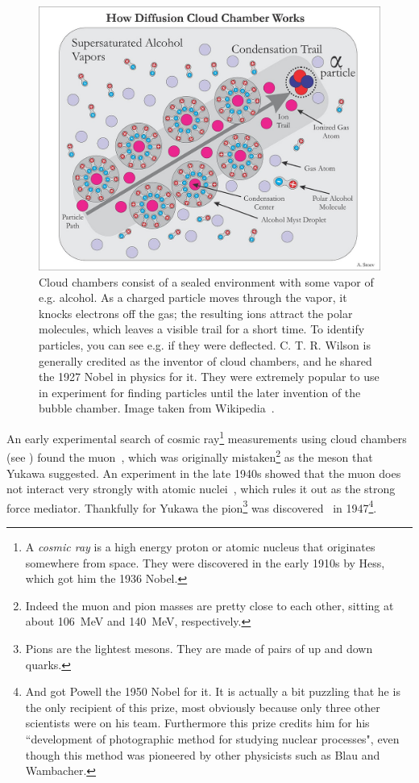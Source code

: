 \begin{figure}
  \centering
  \includegraphics[width=\linewidth]{figs/Diffusion_Cloud_chamber_explained.jpg}
  \caption{Cloud chambers consist of a sealed environment with some vapor
           of e.g. alcohol. As a charged particle moves through the vapor, it knocks
           electrons off the gas; the resulting ions attract the polar molecules,
           which leaves a visible trail for a short time. To identify particles,
           you can see e.g. if they were deflected. C. T. R. Wilson is generally 
           credited as the inventor of cloud chambers, and he shared the 1927 Nobel
           in physics for it. They were extremely popular to use in experiment
           for finding particles until the later invention of the bubble chamber.
           Image taken from Wikipedia~\cite{wiki_cloud}.}
  \label{fig:cloud}
\end{figure}

An early experimental search of cosmic ray\footnote{A {\it cosmic ray} is a high
energy proton or atomic nucleus that originates somewhere from space. They were
discovered in the early 1910s by Hess, which got him the 1936 Nobel.}
 measurements using
cloud chambers (see ) 
found the muon~\cite{neddermeyer_note_1937}, which was originally 
mistaken\footnote{Indeed the muon and pion masses are pretty close to each
other, sitting at about 106~MeV and 140~MeV, respectively.}
as the meson that Yukawa suggested. An experiment in the late 1940s showed that
the muon does not interact very strongly with atomic
nuclei~\cite{conversi_disintegration_1947}, which rules it out as the strong
force mediator. Thankfully for Yukawa the
pion\footnote{Pions are the lightest
mesons. They are made of pairs of up and down quarks.} was
discovered~\cite{lattes_processes_1947} in 1947\footnote{And got Powell
the 1950 Nobel for it. It is actually a bit puzzling that he is the only
recipient of this prize, most obviously because only three other scientists were
on his team. Furthermore this prize credits him for his ``development of
photographic method for studying nuclear processes", even though this method was
pioneered by other physicists such as Blau and Wambacher.}.



